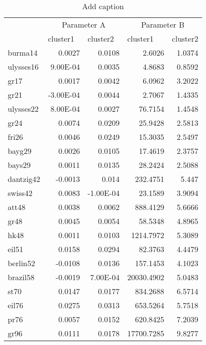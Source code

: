 \begin{table}[htbp]
  \centering
  \caption{Add caption}
    \begin{tabular}{lrrrr}
          & \multicolumn{2}{c}{Parameter A} & \multicolumn{2}{c}{Parameter B} \\
          & \multicolumn{1}{l}{cluster1} & \multicolumn{1}{l}{cluster2} & \multicolumn{1}{l}{cluster1} & \multicolumn{1}{l}{cluster2} \\
    burma14 & 0.0027 & 0.0108 & 2.6026 & 1.0374 \\
    ulysses16 & 9.00E-04 & 0.0035 & 4.8683 & 0.8592 \\
    gr17  & 0.0017 & 0.0042 & 6.0962 & 3.2022 \\
    gr21  & -3.00E-04 & 0.0044 & 2.7067 & 1.4335 \\
    ulysses22 & 8.00E-04 & 0.0027 & 76.7154 & 1.4548 \\
    gr24  & 0.0074 & 0.0209 & 25.9428 & 2.5813 \\
    fri26 & 0.0046 & 0.0249 & 15.3035 & 2.5497 \\
    bayg29 & 0.0026 & 0.0105 & 17.4619 & 2.3757 \\
    bays29 & 0.0011 & 0.0135 & 28.2424 & 2.5088 \\
    dantzig42 & -0.0013 & 0.014 & 232.4751 & 5.447 \\
    swiss42 & 0.0083 & -1.00E-04 & 23.1589 & 3.9094 \\
    att48 & 0.0038 & 0.0062 & 888.4129 & 5.6666 \\
    gr48  & 0.0045 & 0.0054 & 58.5348 & 4.8965 \\
    hk48  & 0.0011 & 0.0103 & 1214.7972 & 5.3089 \\
    eil51 & 0.0158 & 0.0294 & 82.3763 & 4.4479 \\
    berlin52 & -0.0108 & 0.0136 & 157.1453 & 4.1023 \\
    brazil58 & -0.0019 & 7.00E-04 & 20030.4902 & 5.0483 \\
    st70  & 0.0147 & 0.0177 & 834.2688 & 6.5714 \\
    eil76 & 0.0275 & 0.0313 & 653.5264 & 5.7518 \\
    pr76  & 0.0057 & 0.0152 & 620.8425 & 7.2039 \\
    gr96  & 0.0111 & 0.0178 & 17700.7285 & 9.8277 \\
    \end{tabular}%
  \label{tab:addlabel}%
\end{table}%
